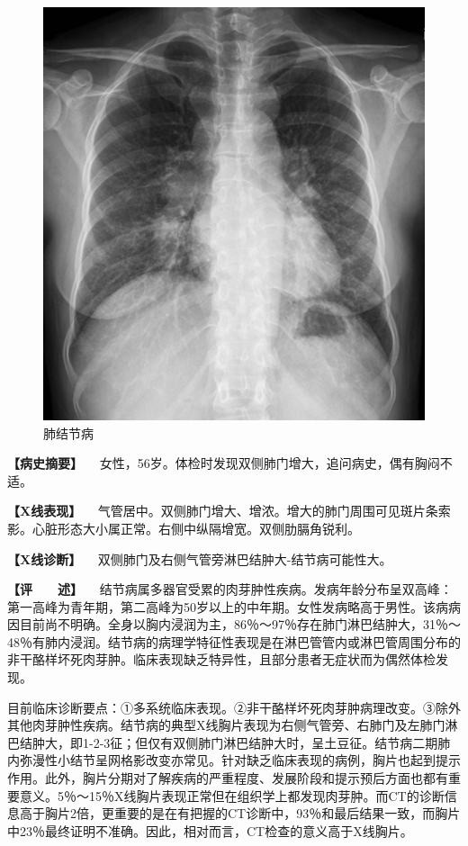 \begin{figure}[!htbp]
 \centering
 \includegraphics{./images/Image00180.jpg}
 \captionsetup{justification=centering}
 \caption{肺结节病}
 \label{fig3-10-1}
  \end{figure} 

\textbf{【病史摘要】}
　女性，56岁。体检时发现双侧肺门增大，追问病史，偶有胸闷不适。

\textbf{【X线表现】}
　气管居中。双侧肺门增大、增浓。增大的肺门周围可见斑片条索影。心脏形态大小属正常。右侧中纵隔增宽。双侧肋膈角锐利。

\textbf{【X线诊断】} 　双侧肺门及右侧气管旁淋巴结肿大-结节病可能性大。

\textbf{【评　　述】}
　结节病属多器官受累的肉芽肿性疾病。发病年龄分布呈双高峰：第一高峰为青年期，第二高峰为50岁以上的中年期。女性发病略高于男性。该病病因目前尚不明确。全身以胸内浸润为主，86％～97％存在肺门淋巴结肿大，31％～48％有肺内浸润。结节病的病理学特征性表现是在淋巴管管内或淋巴管周围分布的非干酪样坏死肉芽肿。临床表现缺乏特异性，且部分患者无症状而为偶然体检发现。

目前临床诊断要点：①多系统临床表现。②非干酪样坏死肉芽肿病理改变。③除外其他肉芽肿性疾病。结节病的典型X线胸片表现为右侧气管旁、右肺门及左肺门淋巴结肿大，即1-2-3征；但仅有双侧肺门淋巴结肿大时，呈土豆征。结节病二期肺内弥漫性小结节呈网格影改变亦常见。针对缺乏临床表现的病例，胸片也起到提示作用。此外，胸片分期对了解疾病的严重程度、发展阶段和提示预后方面也都有重要意义。5％～15％X线胸片表现正常但在组织学上都发现肉芽肿。而CT的诊断信息高于胸片2倍，更重要的是在有把握的CT诊断中，93％和最后结果一致，而胸片中23％最终证明不准确。因此，相对而言，CT检查的意义高于X线胸片。

